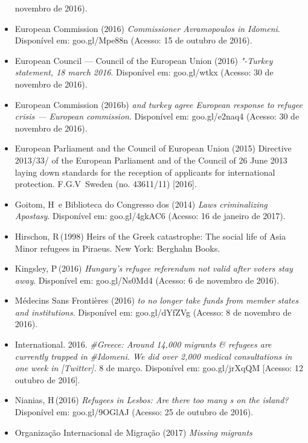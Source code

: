 \begin{itemize}
  novembro de 2016).
\item
  European Commission (2016) \emph{Commissioner Avramopoulos in
  Idomeni}. Disponível em: goo.gl/Mpe88n (Acesso: 15 de outubro de
  2016).
\item
  European Council --- Council of the European Union (2016)
  \emph{"-Turkey statement, 18 march 2016}. Disponível em:
  goo.gl/wtkx (Acesso: 30 de novembro de 2016).
\item
  European Commission (2016b) \emph{ and turkey agree European
  response to refugee crisis --- European commission}. Disponível em:
  goo.gl/e2naq4 (Acesso: 30 de novembro de 2016).
\item
  European Parliament and the Council of European Union (2015) Directive
  2013/33/ of the European Parliament and of the Council of 26 June
  2013 laying down standards for the reception of applicants for
  international protection. F.G.V\, Sweden (no. 43611/11) {[}2016{]}.
\item
  Goitom, H\, e Biblioteca do Congresso dos  (2014) \emph{Laws
  criminalizing Apostasy}. Disponível em: goo.gl/4gk{AC}6 (Acesso: 16 de
  janeiro de 2017).
\item
  Hirschon, R\,(1998) Heirs of the Greek catastrophe: The social life of
  Asia Minor refugees in Piraeus. New York: Berghahn Books.
\item
  Kingsley, P\,(2016) \emph{Hungary}\emph{'}\emph{s refugee referendum
  not valid after voters stay away}. Disponível em: goo.gl/Ns0Md4
  (Acesso: 6 de novembro de 2016).
\item
  Médecins Sans Frontières (2016) \emph{ to no longer take funds from
   member states and institutions}. Disponível em:
  goo.gl/dYfZVg
  (Acesso: 8 de novembro de 2016).
\item
   International. 2016.
  \emph{{\#Greece}}\emph{:
  Around 14,000 migrants \& refugees are currently trapped in}
  \emph{{\#Idomeni}}\emph{.
  We did over 2,000 medical consultations in one week in
   [Twitter]. }8 de março. Disponível em: goo.gl/jrXq{QM} {[}Acesso:
  12 outubro de 2016{]}.
\item
  Nianias, H\,(2016) \emph{Refugees in Lesbos: Are there too many s
  on the island?} Disponível em: goo.gl/9{OG}l{AJ} (Acesso: 25 de outubro de
  2016).
\item
  Organização Internacional de Migração (2017) \emph{Missing migrants
}
\end{itemize}
